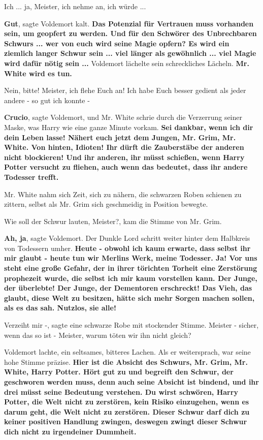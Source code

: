 \glqq{}Ich ... ja, Meister, ich nehme an, ich würde ...\grqq{}

\glqq{}\textbf{Gut}\grqq{}, sagte Voldemort kalt. \glqq{}\textbf{Das Potenzial für
Vertrauen muss vorhanden sein, um geopfert zu werden. Und für den Schwörer des
Unbrechbaren Schwurs ... wer von euch wird seine Magie opfern? Es wird ein
ziemlich langer Schwur sein ... viel länger als gewöhnlich ... viel Magie wird
dafür nötig sein ...}\grqq{} Voldemort lächelte sein schreckliches Lächeln. \glqq{}
\textbf{Mr. White wird es tun.}\grqq{}

\glqq{}Nein, bitte! Meister, ich flehe Euch an! Ich habe Euch besser gedient als
jeder andere - so gut ich konnte -\grqq{}

\glqq{}\textbf{Crucio}\grqq{}, sagte Voldemort, und Mr. White schrie durch die
Verzerrung seiner Maske, was Harry wie eine ganze Minute vorkam. \glqq{}
\textbf{Sei dankbar, wenn ich dir dein Leben lasse! Nähert euch jetzt dem
Jungen, Mr. Grim, Mr. White. Von hinten, Idioten! Ihr dürft die Zauberstäbe der
anderen nicht blockieren! Und ihr anderen, ihr müsst schießen, wenn Harry Potter
versucht zu fliehen, auch wenn das bedeutet, dass ihr andere Todesser trefft.}\grqq{}

Mr. White nahm sich Zeit, sich zu nähern, die schwarzen Roben schienen zu
zittern, selbst als Mr. Grim sich geschmeidig in Position bewegte.

\glqq{}Wie soll der Schwur lauten, Meister?\grqq{}, kam die Stimme von Mr. Grim.

\glqq{}\textbf{Ah, ja}\grqq{}, sagte Voldemort. Der Dunkle Lord schritt weiter
hinter dem Halbkreis von Todessern umher. \glqq{}\textbf{Heute - obwohl ich kaum
erwarte, dass selbst ihr mir glaubt - heute tun wir Merlins Werk, meine
Todesser. Ja! Vor uns steht eine große Gefahr, der in ihrer törichten Torheit
eine Zerstörung prophezeit wurde, die selbst ich mir kaum vorstellen kann. Der
Junge, der überlebte! Der Junge, der Dementoren erschreckt! Das Vieh, das
glaubt, diese Welt zu besitzen, hätte sich mehr Sorgen machen sollen, als es das
sah. Nutzlos, sie alle!}\grqq{}

\glqq{}Verzeiht mir -\grqq{}, sagte eine schwarze Robe mit stockender Stimme.
\glqq{}Meister - sicher, wenn das so ist - Meister, warum töten wir ihn nicht
gleich?\grqq{}

Voldemort lachte, ein seltsames, bitteres Lachen. Als er weitersprach, war seine
hohe Stimme präzise. \glqq{}\textbf{Hier ist die Absicht des Schwurs, Mr. Grim,
Mr. White, Harry Potter. Hört gut zu und begreift den Schwur, der geschworen
werden muss, denn auch seine Absicht ist bindend, und ihr drei müsst seine
Bedeutung verstehen. Du wirst schwören, Harry Potter, die Welt nicht zu
zerstören, kein Risiko einzugehen, wenn es darum geht, die Welt nicht zu
zerstören. Dieser Schwur darf dich zu keiner positiven Handlung zwingen,
deswegen zwingt dieser Schwur dich nicht zu irgendeiner Dummheit.}

